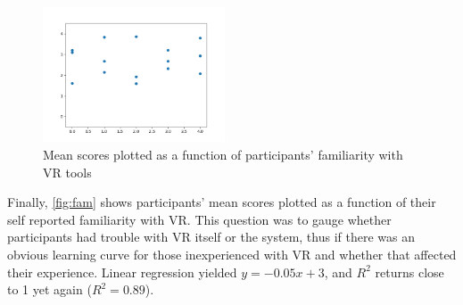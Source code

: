 \begin{figure}[H]
	\centering
	\includegraphics[width = 0.48\textwidth]{Familiarity.png}
	\caption{Mean scores plotted as a function of participants' familiarity with VR tools}
	\label{fig:fam}
\end{figure}

Finally, \autoref{fig:fam} shows participants' mean scores plotted as a function of their self reported familiarity with VR. This question was to gauge whether participants had trouble with VR itself or the system, thus if there was an obvious learning curve for those inexperienced with VR and whether that affected their experience. Linear regression yielded $y = -0.05x + 3$, and $R^2$ returns close to 1 yet again ($R^2=0.89$).